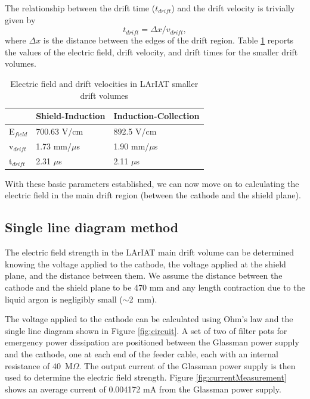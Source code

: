 The relationship between the drift time ($t_{drift}$) and the drift velocity is trivially given by
\begin{equation}
t_{drift} = \Delta x/v_{drift}, \label{eq:drifttime}
\end{equation}
where $\Delta x$ is the distance between the edges of the drift region.
Table \ref{tab:Efields} reports the values of the electric field, drift velocity, and drift times for the smaller drift volumes. 

\begin{table}[]
\centering
\caption{Electric field and drift velocities in LArIAT smaller drift volumes}
\label{tab:Efields}
\begin{tabular}{|l|l|l|}
\hline
& Shield-Induction & Induction-Collection \\ \hline
E$_{field}$ &                 700.63 V/cm        &                892.5  V/cm             \\ \hline
v$_{drift}$ &                   1.73  mm/$\mu$s   &                  1.90 mm/$\mu$s        \\ \hline
t$_{drift}$ &                   2.31  $\mu$s      &                   2.11 $\mu$s          \\ \hline

\end{tabular}
\end{table}

With these basic parameters established, we can now move on to calculating the electric field in the main drift region (between the cathode and the shield plane).

\subsection*{Single line diagram method}
The electric field strength in the LArIAT main drift volume can be determined knowing the voltage applied to the cathode, the voltage applied at the shield plane, and the distance between them. We assume the distance between the cathode and the shield plane to be 470 mm and any length contraction due to the liquid argon is negligibly small ($\sim$2~mm).

The voltage applied to the cathode can be calculated using Ohm's law and the single line diagram shown in Figure \ref{fig:circuit}.  A set of two of filter pots for emergency power dissipation are positioned between the Glassman power supply and the cathode, one at each end of the feeder cable, each with an internal resistance of 40~M$\Omega$.  The output current of the Glassman power supply is then used to determine the electric field strength.  Figure \ref{fig:currentMeasurement} shows an average current of 0.004172 mA from the Glassman power supply.  

